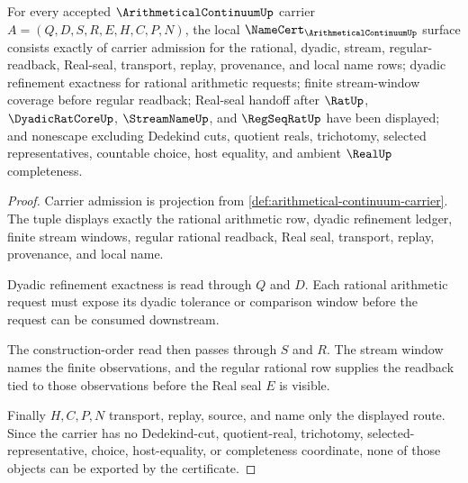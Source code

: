 \begin{theorem}
\label{thm:arithmetical-continuum-namecert-obligations}
For every accepted $\ArithmeticalContinuumUp$ carrier $A=(Q,D,S,R,E,H,C,P,N)$, the local $\NameCert_{\ArithmeticalContinuumUp}$ surface consists exactly of carrier admission for the rational, dyadic, stream, regular-readback, Real-seal, transport, replay, provenance, and local name rows; dyadic refinement exactness for rational arithmetic requests; finite stream-window coverage before regular readback; Real-seal handoff after $\RatUp$, $\DyadicRatCoreUp$, $\StreamNameUp$, and $\RegSeqRatUp$ have been displayed; and nonescape excluding Dedekind cuts, quotient reals, trichotomy, selected representatives, countable choice, host equality, and ambient $\RealUp$ completeness.
\end{theorem}
\begin{proof}
Carrier admission is projection from \autoref{def:arithmetical-continuum-carrier}. The tuple displays exactly the rational arithmetic row, dyadic refinement ledger, finite stream windows, regular rational readback, Real seal, transport, replay, provenance, and local name.

Dyadic refinement exactness is read through $Q$ and $D$. Each rational arithmetic request must expose its dyadic tolerance or comparison window before the request can be consumed downstream.

The construction-order read then passes through $S$ and $R$. The stream window names the finite observations, and the regular rational row supplies the readback tied to those observations before the Real seal $E$ is visible.

Finally $H,C,P,N$ transport, replay, source, and name only the displayed route. Since the carrier has no Dedekind-cut, quotient-real, trichotomy, selected-representative, choice, host-equality, or completeness coordinate, none of those objects can be exported by the certificate.
\end{proof}

